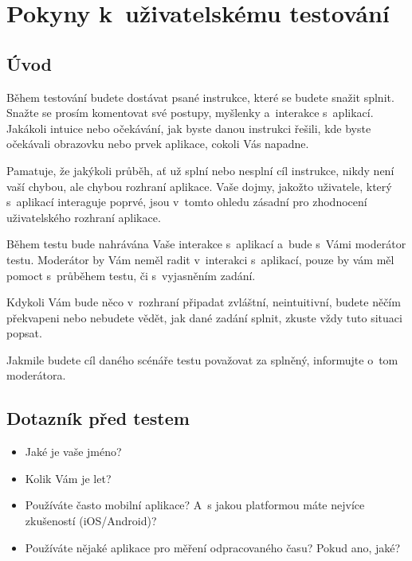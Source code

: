 \chapter{Pokyny k uživatelskému testování}\label{appendix:ui-testing-instructions}

\section*{Úvod}

Během testování budete dostávat psané instrukce, které se budete snažit splnit. Snažte se prosím komentovat své postupy, myšlenky a~interakce s~aplikací. Jakákoli intuice nebo očekávání, jak byste danou instrukci řešili, kde byste očekávali obrazovku nebo prvek aplikace, cokoli Vás napadne.

Pamatuje, že jakýkoli průběh, ať už splní nebo nesplní cíl instrukce, nikdy není vaší chybou, ale chybou rozhraní aplikace. Vaše dojmy, jakožto uživatele, který s~aplikací interaguje poprvé, jsou v tomto ohledu zásadní pro zhodnocení uživatelského rozhraní aplikace.

Během testu bude nahrávána Vaše interakce s aplikací a~bude s~Vámi moderátor testu. Moderátor by Vám neměl radit v~interakci s~aplikací, pouze by vám měl pomoct s~průběhem testu, či s~vyjasněním zadání.

Kdykoli Vám bude něco v~rozhraní připadat zvláštní, neintuitivní, budete něčím překvapeni nebo nebudete vědět, jak dané zadání splnit, zkuste vždy tuto situaci popsat.

Jakmile budete cíl daného scénáře testu považovat za splněný, informujte o~tom moderátora.

\section*{Dotazník před testem}

\begin{itemize}
\item Jaké je vaše jméno?
\item Kolik Vám je let?
\item Používáte často mobilní aplikace? A~s jakou platformou máte nejvíce zkušeností (iOS/Android)?
\item Používáte nějaké aplikace pro měření odpracovaného času? Pokud ano, jaké?
\end{itemize}

